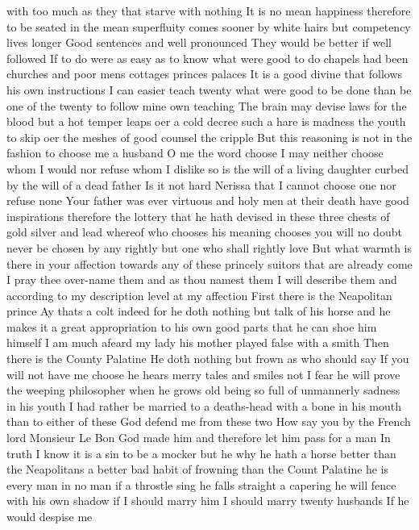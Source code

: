 with too much as they that starve with nothing It 
is no mean happiness therefore to be seated in the 
mean superfluity comes sooner by white hairs but 
competency lives longer 
Good sentences and well pronounced 
They would be better if well followed 
If to do were as easy as to know what were good to 
do chapels had been churches and poor mens 
cottages princes palaces It is a good divine that 
follows his own instructions I can easier teach 
twenty what were good to be done than be one of the 
twenty to follow mine own teaching The brain may 
devise laws for the blood but a hot temper leaps 
oer a cold decree such a hare is madness the 
youth to skip oer the meshes of good counsel the 
cripple But this reasoning is not in the fashion to 
choose me a husband O me the word choose I may 
neither choose whom I would nor refuse whom I 
dislike so is the will of a living daughter curbed 
by the will of a dead father Is it not hard 
Nerissa that I cannot choose one nor refuse none 
Your father was ever virtuous and holy men at their 
death have good inspirations therefore the lottery 
that he hath devised in these three chests of gold 
silver and lead whereof who chooses his meaning 
chooses you will no doubt never be chosen by any 
rightly but one who shall rightly love But what 
warmth is there in your affection towards any of 
these princely suitors that are already come 
I pray thee over-name them and as thou namest 
them I will describe them and according to my 
description level at my affection 
First there is the Neapolitan prince 
Ay thats a colt indeed for he doth nothing but 
talk of his horse and he makes it a great 
appropriation to his own good parts that he can 
shoe him himself I am much afeard my lady his 
mother played false with a smith 
Then there is the County Palatine 
He doth nothing but frown as who should say If you 
will not have me choose he hears merry tales and 
smiles not I fear he will prove the weeping 
philosopher when he grows old being so full of 
unmannerly sadness in his youth I had rather be 
married to a deaths-head with a bone in his mouth 
than to either of these God defend me from these 
two 
How say you by the French lord Monsieur Le Bon 
God made him and therefore let him pass for a man 
In truth I know it is a sin to be a mocker but 
he why he hath a horse better than the 
Neapolitans a better bad habit of frowning than 
the Count Palatine he is every man in no man if a 
throstle sing he falls straight a capering he will 
fence with his own shadow if I should marry him I 
should marry twenty husbands If he would despise me 
